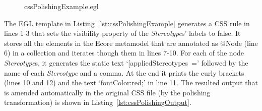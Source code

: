 \begin{figure}[ht!]
	
	{cssPolishingExample.egl}
\end{figure}


\begin{figure}[ht!]
	\vspace*{-5mm}
	
\end{figure}

The EGL template in Listing~\ref{lst:cssPolishingExample} generates a CSS rule in lines 1-3 that sets the visibility property of the  \textit{Stereotype}s' labels to false. 
It stores all the elements in the Ecore metamodel that are annotated as @Node (line 6) in a collection and iterates though them in lines 7-10. 
For each of the node \textit{Stereotype}s, it generates the static text `[appliedStereotypes~=' followed by the name of each  \textit{Stereotype} and a comma. 
At the end it prints the curly brackets (lines 10 and 12) and the text `fontColor:red;' in line 11. 
The resulted output that is amended automatically in the original CSS file (by the polishing transformation) is shown in Listing~\ref{lst:cssPolishingOutput}.

\begin{figure}[ht!]

	
\end{figure}



